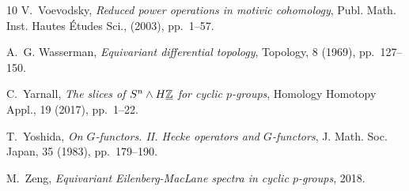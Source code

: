 \documentclass[a4paper,leqno,11pt]{amsart}
\theoremstyle{plain}
\theoremstyle{definition}
\theoremstyle{remark}
\theoremstyle{definition}
\numberwithin{equation}{section}
\begin{document}
\begin{thebibliography}{10}
{\sc V.~Voevodsky}, {\em Reduced power operations in motivic cohomology}, Publ.
  Math. Inst. Hautes \'{E}tudes Sci.,  (2003), pp.~1--57.

{\sc A.~G. Wasserman}, {\em Equivariant differential topology}, Topology, 8
  (1969), pp.~127--150.

{\sc C.~Yarnall}, {\em The slices of {$S^n\wedge H\underline{\Bbb Z}$} for
  cyclic {$p$}-groups}, Homology Homotopy Appl., 19 (2017), pp.~1--22.

{\sc T.~Yoshida}, {\em On {$G$}-functors. {II}. {H}ecke operators and
  {$G$}-functors}, J. Math. Soc. Japan, 35 (1983), pp.~179--190.

{\sc M.~Zeng}, {\em Equivariant {E}ilenberg-{M}ac{L}ane spectra in cyclic
  $p$-groups}, 2018.

\end{thebibliography}

	
	
	
\end{document}
